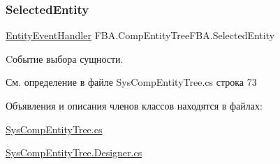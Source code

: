 \subsubsection{\texorpdfstring{Selected\+Entity}{SelectedEntity}}
{\footnotesize\ttfamily \mbox{\hyperlink{namespace_f_b_a_a05acb24d71f58b94b801674d2a8c5b17}{Entity\+Event\+Handler}} F\+B\+A.\+Comp\+Entity\+Tree\+F\+B\+A.\+Selected\+Entity}



Cобытие выбора сущности. 



См. определение в файле Sys\+Comp\+Entity\+Tree.\+cs строка 73



Объявления и описания членов классов находятся в файлах\+:\begin{DoxyCompactItemize}
\item 
\mbox{\hyperlink{_sys_comp_entity_tree_8cs}{Sys\+Comp\+Entity\+Tree.\+cs}}\item 
\mbox{\hyperlink{_sys_comp_entity_tree_8_designer_8cs}{Sys\+Comp\+Entity\+Tree.\+Designer.\+cs}}\end{DoxyCompactItemize}
